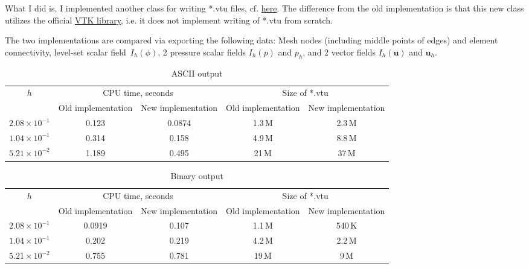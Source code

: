 \documentclass[12pt]{article}
\newcommand{\vect}[1]{\boldsymbol{\mathbf{#1}}}
\begin{document}
What I did is, I implemented another class for writing *.vtu files, cf. \href{https://git.rwth-aachen.de/DROPS/drops/blob/uh/src/surfnavierstokes/VTKWriter.hpp}{here}. The difference from the old implementation is that this new class utilizes the official \href{https://gitlab.kitware.com/vtk/vtk}{VTK library}, i.e. it does not implement writing of *.vtu from scratch.

The two implementations are compared via exporting the following data: Mesh nodes (including middle points of edges) and element connectivity, level-set scalar field~$I_h(\phi)$, 2 pressure scalar fields $I_h(p)$ and $p_h$, and 2 vector fields $I_h(\vect u)$ and $\vect u_h$.

\begin{table}[H]
	\centering
	\caption{ASCII output} \label{tab:vtk:ascii}
	\footnotesize
	\begin{tabular}[1.2]{|c|c|c|c|c|}
		\hline
		\multirow{2}{*}{$h$} & \multicolumn{2}{c|}{CPU time, seconds} & \multicolumn{2}{c|}{Size of *.vtu} \\ 
		\cline{2-5}
		& Old implementation & New implementation & Old implementation & New implementation \\ 
		\hline
		$2.08\times	10^{-1}$ & 0.123 & 0.0874 & 1.3\,M & 2.3\,M \\
		\hline
		$1.04\times	10^{-1}$ & 0.314 & 0.158 & 4.9\,M & 8.8\,M \\
		\hline
		$5.21\times	10^{-2}$ & 1.189 & 0.495 & 21\,M & 37\,M \\
		\hline
	\end{tabular}
\end{table}

\begin{table}[H]
	\centering
	\caption{Binary output} \label{tab:vtk:bin}
	\footnotesize
	\begin{tabular}[1.2]{|c|c|c|c|c|}
		\hline
		\multirow{2}{*}{$h$} & \multicolumn{2}{c|}{CPU time, seconds} & \multicolumn{2}{c|}{Size of *.vtu} \\ 
		\cline{2-5}
		& Old implementation & New implementation & Old implementation & New implementation \\ 
		\hline
		$2.08\times	10^{-1}$ & 0.0919 & 0.107 & 1.1\,M & 540\,K \\
		\hline
		$1.04\times	10^{-1}$ & 0.202 & 0.219 & 4.2\,M & 2.2\,M \\
		\hline
		$5.21\times	10^{-2}$ & 0.755 & 0.781 & 19\,M & 9\,M \\
		\hline
	\end{tabular}
\end{table}
\end{document}

